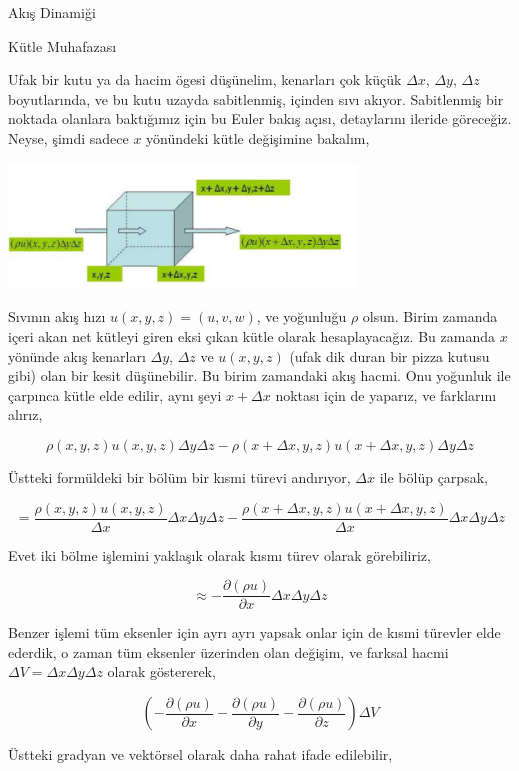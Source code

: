 \documentclass[12pt,fleqn]{article}\usepackage{../../common}
\begin{document}
Akış Dinamiği

Kütle Muhafazası

Ufak bir kutu ya da hacim ögesi düşünelim, kenarları çok küçük $\Delta x$,
$\Delta y$, $\Delta z$ boyutlarında, ve bu kutu uzayda sabitlenmiş, içinden sıvı
akıyor. Sabitlenmiş bir noktada olanlara baktığımız için bu Euler bakış açısı,
detaylarını ileride göreceğiz. Neyse, şimdi sadece $x$ yönündeki kütle
değişimine bakalım, 

\includegraphics[width=25em]{phy_050_fluid_02.jpg}

Sıvının akış hızı $u(x,y,z) = (u,v,w)$, ve yoğunluğu $\rho$ olsun. Birim zamanda
içeri akan net kütleyi giren eksi çıkan kütle olarak hesaplayacağız. Bu zamanda
$x$ yönünde akış kenarları $\Delta y$, $\Delta z$ ve $u(x,y,z)$ (ufak dik duran
bir pizza kutusu gibi) olan bir kesit düşünebilir. Bu birim zamandaki akış
hacmi.  Onu yoğunluk ile çarpınca kütle elde edilir, aynı şeyi $x + \Delta x$
noktası için de yaparız, ve farklarını alırız,

$$
\rho(x,y,z)u(x,y,z)\Delta y \Delta z -
\rho(x+\Delta x,y,z) u(x+\Delta x,y,z)\Delta y \Delta z
$$

Üstteki formüldeki bir bölüm bir kısmi türevi andırıyor, $\Delta x$ ile bölüp
çarpsak,

$$
= \frac{\rho(x,y,z)u(x,y,z)}{\Delta x}\Delta x \Delta y \Delta z -
\frac{\rho(x+\Delta x,y,z) u(x+\Delta x,y,z)}{\Delta x} \Delta x \Delta y \Delta z
$$

Evet iki bölme işlemini yaklaşık olarak kısmı türev olarak görebiliriz,

$$
\approx -\frac{\partial (\rho u) }{\partial x} \Delta x \Delta y \Delta z
$$

Benzer işlemi tüm eksenler için ayrı ayrı yapsak onlar için de kısmi türevler
elde ederdik, o zaman tüm eksenler üzerinden olan değişim, ve farksal hacmi
$\Delta V = \Delta x \Delta y \Delta z$ olarak göstererek,

$$
\left(
-\frac{\partial (\rho u) }{\partial x} 
-\frac{\partial (\rho u) }{\partial y} 
-\frac{\partial (\rho u) }{\partial z} 
\right) \Delta V
$$

Üstteki gradyan ve vektörsel olarak daha rahat ifade edilebilir,
\end{document}
